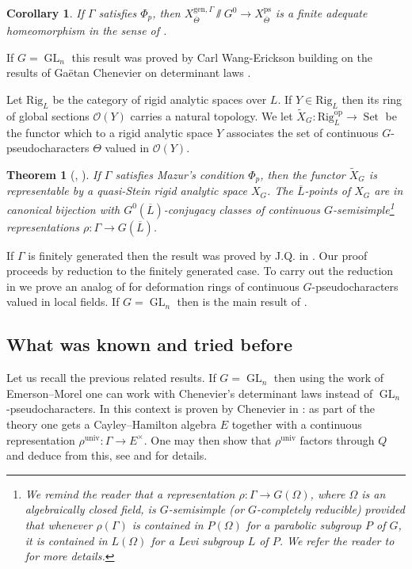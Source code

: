 \documentclass{amsart}
\newtheorem{cor}[prop]{Corollary}
\newtheorem{thm}[prop]{Theorem}
\theoremstyle{definition}
\theoremstyle{remark}
\DeclareMathOperator{\GL}{GL}
\DeclareMathOperator{\Set}{Set}
\newcommand{\OO}{\mathcal O}
\newcommand{\gen}{\mathrm{gen}}
\newcommand{\univ}{\mathrm{univ}}
\newcommand{\Lbar}{\overline{L}}
\newcommand{\Thetabar}{\overline{\Theta}}
\newcommand{\ps}{\mathrm{ps}}
\newcommand{\Rig}{\mathrm{Rig}}
\newcommand{\op}{\mathrm{op}}
\begin{document}
\begin{cor} If $\Gamma$ satisfies $\Phi_p$, then $X^{\gen, \Gamma}_{\Thetabar}\sslash G^0 \rightarrow X^{\ps}_{\Thetabar}$ is a finite adequate homeomorphism in the sense 
of \cite[Definition 3.3.1]{alper}.
\end{cor} 

If $G=\GL_n$ this result was proved by Carl Wang-Erickson \cite{WE_alg} building on the results of Ga\"etan Chenevier on determinant laws \cite{che_durham}. 

Let $\Rig_L$  be the category of rigid analytic spaces over $L$. If $Y\in \Rig_L$ then 
its ring of global sections $\OO(Y)$ carries a natural topology. We let 
$\tilde{X}_G: \Rig_L^{\op} \rightarrow \Set$ be the functor 
which to a rigid analytic space  $Y$ associates the set of 
continuous $G$-pseudocharacters $\Theta$ valued in $\OO(Y)$. 



\begin{thm}[{, }]\label{main_rigid_intro} If $\Gamma$ satisfies Mazur's  condition $\Phi_p$, then 
the functor $\tilde{X}_G$ is representable by a quasi-Stein rigid analytic space
$X_G$. The $\Lbar$-points of $X_G$ are in canonical bijection with $G^0(\Lbar)$-conjugacy classes of continuous $G$-semisimple\footnote{We remind the reader that a representation 
$\rho: \Gamma\rightarrow G(\Omega) $, where $\Omega$ is an algebraically closed field, is $G$-semisimple (or $G$-completely reducible)  provided that whenever
$\rho(\Gamma)$  is contained in 
$P(\Omega)$ for a parabolic subgroup $P$ of $G$, it is contained in $L(\Omega)$ for a Levi subgroup $L$ of $P$. We  refer the reader to \cite[Section 6]{BMR} for more details.}
representations
$\rho: \Gamma \rightarrow G(\Lbar)$. 
\end{thm}

If $\Gamma$ is finitely generated then the result was proved by J.Q. in \cite{quast}.
Our proof proceeds by reduction to the finitely generated case. To carry out the 
reduction in  we prove an analog of  for 
deformation rings of continuous $G$-pseudocharacters valued in local fields. 
If $G=\GL_n$ then  is the main result of \cite{che_durham}.

\subsection{What was known and tried before} Let us  recall the previous related results.
If $G=\GL_n$ then using the work of Emerson--Morel \cite{emerson2023comparison} 
one can work with Chenevier's determinant laws instead of $\GL_n$-pseudocharacters. In this context  is proven by Chenevier in \cite{che_durham}: 
as part of the theory  one gets a Cayley--Hamilton algebra $E$ together with 
a continuous representation $\rho^{\univ}: \Gamma \rightarrow E^{\times}$. One may then show that  $\rho^{\univ}$ factors through $Q$ and deduce  from this, 
see \cite[Lemma 3.8]{che_durham} and \cite[Lemma 5.5]{defG} for details. 
\end{document}
